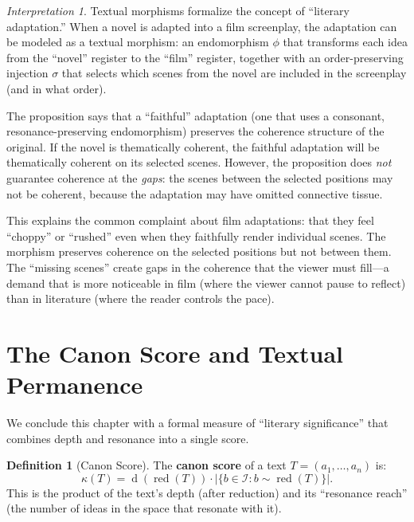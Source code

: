 \documentclass[11pt,openany]{book}
\theoremstyle{definition}
\newtheorem{definition}[axiom]{Definition}
\theoremstyle{plain}
\theoremstyle{remark}
\newtheorem{interpretation}[axiom]{Interpretation}
\newcommand{\IS}{\mathcal{I}}               %
\newcommand{\res}{\sim}                      %
\newcommand{\depth}{\operatorname{d}}       %
\begin{document}
\begin{interpretation}
Textual morphisms formalize the concept of ``literary adaptation.'' When a novel is adapted into a film screenplay, the adaptation can be modeled as a textual morphism: an endomorphism $\phi$ that transforms each idea from the ``novel'' register to the ``film'' register, together with an order-preserving injection $\sigma$ that selects which scenes from the novel are included in the screenplay (and in what order).

The proposition says that a ``faithful'' adaptation (one that uses a consonant, resonance-preserving endomorphism) preserves the coherence structure of the original. If the novel is thematically coherent, the faithful adaptation will be thematically coherent on its selected scenes. However, the proposition does \emph{not} guarantee coherence at the \emph{gaps}: the scenes between the selected positions may not be coherent, because the adaptation may have omitted connective tissue.

This explains the common complaint about film adaptations: that they feel ``choppy'' or ``rushed'' even when they faithfully render individual scenes. The morphism preserves coherence on the selected positions but not between them. The ``missing scenes'' create gaps in the coherence that the viewer must fill---a demand that is more noticeable in film (where the viewer cannot pause to reflect) than in literature (where the reader controls the pace).
\end{interpretation}

\section{The Canon Score and Textual Permanence}

We conclude this chapter with a formal measure of ``literary significance'' that combines depth and resonance into a single score.

\begin{definition}[Canon Score]
The \textbf{canon score} of a text $T = (a_1, \ldots, a_n)$ is:
\[
\kappa(T) = \depth(\operatorname{red}(T)) \cdot |\{b \in \IS : b \res \operatorname{red}(T)\}|.
\]
This is the product of the text's depth (after reduction) and its ``resonance reach'' (the number of ideas in the space that resonate with it).
\end{definition}
\end{document}
